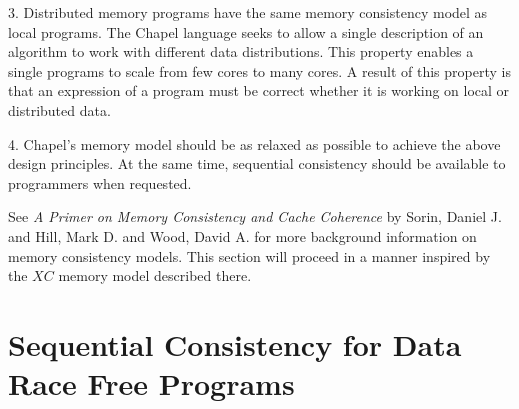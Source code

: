 3. Distributed memory programs have the same memory consistency model as local programs. The Chapel language seeks to allow a single description of an algorithm to work with different data distributions. This property enables a single programs to scale from few cores to many cores. A result of this property is that an expression of a program must be correct whether it is working on local or distributed data.

4. Chapel's memory model should be as relaxed as possible to achieve the above design principles. At the same time, sequential consistency should be available to programmers when requested.

See \textit{A Primer on Memory Consistency and Cache Coherence} by Sorin,
Daniel J. and Hill, Mark D. and Wood, David A. for more background information
on memory consistency models. This section will proceed in a manner inspired by the $XC$ memory model described there.

\section{Sequential Consistency for Data Race Free Programs}


